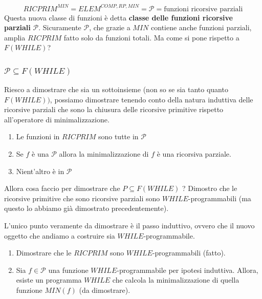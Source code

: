 \documentclass{article}
\begin{document}
$$RICPRIM^{MIN}= ELEM^{COMP,RP,MIN}=\mathcal{P}={\text{funzioni ricorsive parziali}}$$
Questa nuova classe di funzioni è detta \textbf{classe delle funzioni ricorsive
    parziali} $\mathcal{P}$. Sicuramente $\mathcal{P}$, che grazie a $MIN$ contiene anche
funzioni parziali, amplia $RICPRIM$ fatto solo da funzioni totali. Ma come si pone
rispetto a $F(WHILE)$?
\subsubsection{$\mathcal{P}\subseteq F(WHILE)$}
Riesco a dimostrare che sia un sottoinsieme (non so se sia tanto quanto $F(WHILE))$,
possiamo dimostrare tenendo conto della natura induttiva delle ricorsive parziali che
sono la chiusura delle ricorsive primitive rispetto all'operatore di minimalizzazione.

\begin{enumerate}
    \item Le funzioni in $RICPRIM$ sono tutte in $\mathcal{P}$
    \item Se $f$ è una $\mathcal{P}$ allora la minimalizzazione di $f$ è
          una ricorsiva parziale.
    \item Nient'altro è in $\mathcal{P}$
\end{enumerate}
Allora cosa faccio per dimostrare che $P\subseteq F(WHILE)$ ? Dimostro che le ricorsive
primitive che sono ricorsive parziali sono $WHILE$-programmabili (ma questo lo abbiamo
già dimostrato precedentemente).

L'unico punto veramente da dimostrare è il passo induttivo, ovvero che il nuovo oggetto
che andiamo a costruire sia $WHILE$-programmabile.

\begin{enumerate}
    \item Dimostrare che le $RICPRIM$ sono $WHILE$-programmabili (fatto).
    \item Sia $f\in\mathcal{P}$ una funzione $WHILE$-programmabile per ipotesi induttiva.
          Allora, esiste un programma $WHILE$ che calcola la minimalizzazione di quella funzione
          $MIN(f)$ (da dimostrare).
\end{enumerate}
\end{document}
